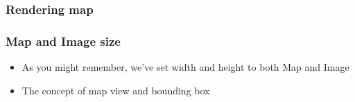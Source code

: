 \documentclass[17pt]{beamer}
\begin{document}
\begin{frame}
  \frametitle{Rendering map}
\end{frame}


\begin{frame}
  \frametitle{Map and Image size}
  \begin{itemize}
  \item As you might remember, we've set width and
    height to both Map and Image
  \item The concept of map view and bounding box
  \end{itemize}
\end{frame}
\end{document}
